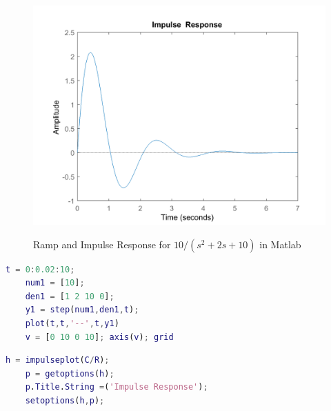 \documentclass[12pt]{article}
\newenvironment{problem}[2][Problem]{\begin{trivlist}
		\item[\hskip \labelsep {\bfseries #1}\hskip \labelsep {\bfseries #2.}]}{\end{trivlist}}
\begin{document}
\begin{problem}{7 --- B-5-10 --- Matlab plotting}
\begin{figure}[H]
\begin{minipage}{.5\textwidth}
	\end{minipage}%
	\begin{minipage}{0.5\textwidth}
		\centering
		\includegraphics[width=1\linewidth]{Images/Q7Impulse}
		\label{fig:q7impulse}
	\end{minipage}
	\caption{Ramp and Impulse Response for $10 / (s^2+2s+10)$ in Matlab}
	\label{fig:q7rampImpulse}
\end{figure}
\begin{lstlisting}[language = Matlab]
	t = 0:0.02:10;
	num1 = [10];
	den1 = [1 2 10 0];
	y1 = step(num1,den1,t);
	plot(t,t,'--',t,y1)
	v = [0 10 0 10]; axis(v); grid
\end{lstlisting}

\begin{lstlisting}[language = Matlab]
	h = impulseplot(C/R);
	p = getoptions(h);
	p.Title.String =('Impulse Response');
	setoptions(h,p);
\end{lstlisting}

\end{problem}
\end{document}
